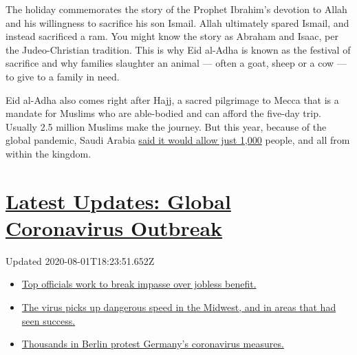 The holiday commemorates the story of the Prophet Ibrahim's devotion to
Allah and his willingness to sacrifice his son Ismail. Allah ultimately
spared Ismail, and instead sacrificed a ram. You might know the story as
Abraham and Isaac, per the Judeo-Christian tradition. This is why Eid
al-Adha is known as the festival of sacrifice and why families slaughter
an animal --- often a goat, sheep or a cow --- to give to a family in
need.

Eid al-Adha also comes right after Hajj, a sacred pilgrimage to Mecca
that is a mandate for Muslims who are able-bodied and can afford the
five-day trip. Usually 2.5 million Muslims make the journey. But this
year, because of the global pandemic, Saudi Arabia
\href{https://www.nytimes.com/2020/07/30/world/middleeast/pilgrims-hajj-mecca-coronavirus-pandemic.html}{said
it would allow just 1,000} people, and all from within the kingdom.

\hypertarget{latest-updates-global-coronavirus-outbreak}{%
\section{\texorpdfstring{\href{https://www.nytimes.com/2020/08/01/world/coronavirus-covid-19.html?action=click\&pgtype=Article\&state=default\&region=MAIN_CONTENT_1\&context=storylines_live_updates}{Latest
Updates: Global Coronavirus
Outbreak}}{Latest Updates: Global Coronavirus Outbreak}}\label{latest-updates-global-coronavirus-outbreak}}

Updated 2020-08-01T18:23:51.652Z

\begin{itemize}
\tightlist
\item
  \href{https://www.nytimes.com/2020/08/01/world/coronavirus-covid-19.html?action=click\&pgtype=Article\&state=default\&region=MAIN_CONTENT_1\&context=storylines_live_updates\#link-3ac56579}{Top
  officials work to break impasse over jobless benefit.}
\item
  \href{https://www.nytimes.com/2020/08/01/world/coronavirus-covid-19.html?action=click\&pgtype=Article\&state=default\&region=MAIN_CONTENT_1\&context=storylines_live_updates\#link-8796723}{The
  virus picks up dangerous speed in the Midwest, and in areas that had
  seen success.}
\item
  \href{https://www.nytimes.com/2020/08/01/world/coronavirus-covid-19.html?action=click\&pgtype=Article\&state=default\&region=MAIN_CONTENT_1\&context=storylines_live_updates\#link-25930521}{Thousands
  in Berlin protest Germany's coronavirus measures.}
\end{itemize}

